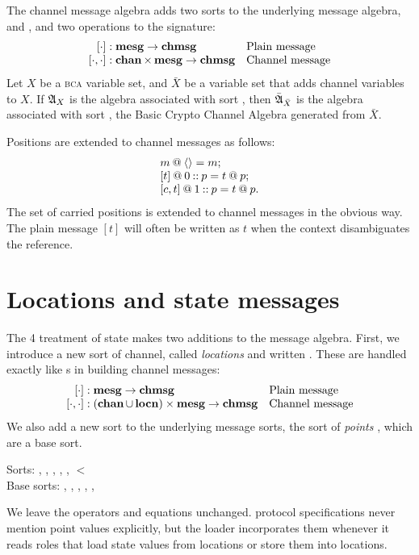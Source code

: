 \documentclass[12pt]{report}
\theoremstyle{definition}
\newcommand{\bca}{\textsc{bca}}
\newcommand{\alga}{\alg{A}}
\newcommand{\algbara}{\bar{\alg{A}}}
\begin{document}
The channel message algebra adds two sorts to the underlying message
algebra,  and , and two operations to the
signature:
\[\begin{array}{r@{{}:{}}ll}
   [\cdot]&\dom{mesg}\rightarrow\dom{chmsg}&\mbox{Plain message}\\ \relax
   [\cdot,\cdot]&\dom{chan}\times\dom{mesg}\rightarrow\dom{chmsg}
   &\mbox{Channel message}
\end{array}\]
Let $X$ be a {\bca} variable set, and $\bar X$ be a variable set that
adds channel variables to $X$.  If $\alga_X$ is the algebra associated
with sort , then $\algbara_{\bar X}$ is the algebra
associated with sort , the Basic Crypto Channel Algebra
generated from $\bar X$.

Positions are extended to channel messages as follows:
\[\begin{array}{l}
m\mathbin{@}\langle\rangle=m;\\ \relax
[t]\mathbin{@} 0\mathbin{::} p=t\mathbin{@} p;\\ \relax
[c,t]\mathbin{@} 1\mathbin{::} p=t\mathbin{@} p.
\end{array}\]
The set of carried positions is extended to channel messages in the
obvious way.  The plain message $[t]$ will often be written as $t$
when the context disambiguates the reference.

\section{Locations and state messages}
\label{sec:locns:and:state}

The {\cpsa} 4 treatment of state makes two additions to the message
algebra.  First, we introduce a new sort of channel, called
\emph{locations} and written .  These are handled exactly
like s in building channel messages:
%
\[\begin{array}{r@{{}:{}}ll}
    [\cdot]&\dom{mesg}\rightarrow\dom{chmsg}&\mbox{Plain message}\\ \relax
    [\cdot,\cdot]&(\dom{chan}\cup\dom{locn})\times\dom{mesg}\rightarrow\dom{chmsg}
                                            &\mbox{Channel message}
\end{array}\]
%
We also add a new sort to the underlying message sorts, the sort of
\emph{points} , which are a base sort.
\begin{center}
  Sorts: , , , , ,
   $<$ \\[1ex]
  Base sorts: , , , ,
  , 
\end{center}
%
We leave the operators and equations unchanged.  {\cpsa} protocol
specifications never mention point values explicitly, but the {\cpsa}
loader incorporates them whenever it reads roles that load state
values from locations or store them into locations.
\end{document}

